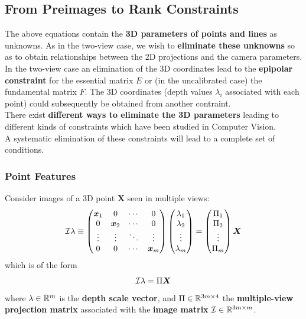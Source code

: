 \subsection{From Preimages to Rank Constraints}%
\label{sub:from_preimages_to_rank_constraints}


The above equations contain the \textbf{3D parameters of points and lines}
as unknowns. As in the two-view case, we wish to
\textbf{eliminate these unknowns} so as to obtain relationships between
the 2D projections and the camera parameters.\\

In the two-view case an elimination of the 3D coordinates lead to the
\textbf{epipolar constraint} for the essential matrix $E$ or
(in the uncalibrated case) the fundamental matrix $F$.
The 3D coordinates (depth values $\lambda_i$ associated with each point)
could subsequently be obtained from another contraint.\\

There exist \textbf{different ways to eliminate the 3D parameters}
leading to different kinds of constraints which have been studied in Computer Vision.\\

A systematic elimination of these constraints will lead to a complete set of conditions.


\subsubsection*{Point Features}%
\label{ssub:point_features}

Consider images of a 3D point $\bm{X}$ seen in multiple views:
\[
	\mathcal{I} \lambda \equiv
		\begin{pmatrix}
			\bm{x}_1 & 0 & \cdots & 0 \\
			0 & \bm{x}_2 & \cdots & 0 \\
			\vdots & \vdots & \ddots & \vdots \\
			0 & 0 & \cdots & \bm{x}_m
		\end{pmatrix}
		\begin{pmatrix}\lambda_1 \\ \lambda_2 \\ \vdots \\ \lambda_m \end{pmatrix}
		= \begin{pmatrix}\Pi_1 \\ \Pi_2 \\ \vdots \\ \Pi_m \end{pmatrix} \bm{X}
\]
which is of the form
\[
	\mathcal{I} \lambda = \Pi \bm{X}
\]
where $\lambda \in \mathbb{R}^m$ is the \textbf{depth scale vector},
and $\Pi \in \mathbb{R}^{3m \times{} 4}$ the \textbf{multiple-view projection matrix}
associated with the \textbf{image matrix} $\mathcal{I} \in \mathbb{R}^{3m \times{} m}$.\\

